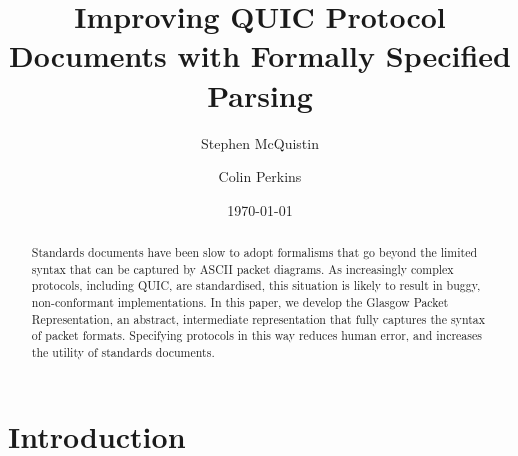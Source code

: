 \documentclass[10pt,sigconf]{acmart}
\begin{document}
\title{Improving QUIC Protocol Documents with Formally Specified Parsing}

\author{Stephen McQuistin}

\author{Colin Perkins}

\date{\today}

\begin{abstract}


Standards documents have been slow to adopt formalisms that go beyond the limited syntax
that can be captured by ASCII packet diagrams. As increasingly complex protocols,
including QUIC, are standardised, this situation is likely to result in buggy,
non-conformant implementations. In this paper, we develop the Glasgow Packet
Representation, an abstract, intermediate representation that fully captures the syntax of
packet formats. Specifying protocols in this way reduces human error, and increases the
utility of standards documents.

\end{abstract}

\maketitle

\section{Introduction}

%
\end{document}

